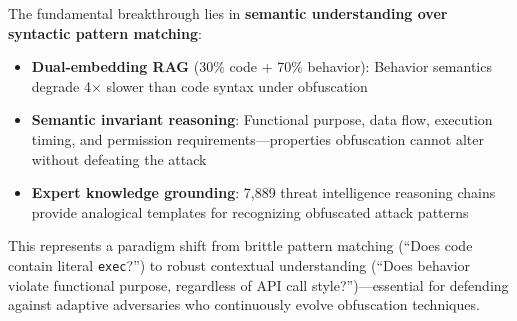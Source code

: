 The fundamental breakthrough lies in \textbf{semantic understanding over syntactic pattern matching}:
\begin{itemize}
    \item \textbf{Dual-embedding RAG} (30\% code + 70\% behavior): Behavior semantics degrade 4$\times$ slower than code syntax under obfuscation
    \item \textbf{Semantic invariant reasoning}: Functional purpose, data flow, execution timing, and permission requirements---properties obfuscation cannot alter without defeating the attack
    \item \textbf{Expert knowledge grounding}: 7,889 threat intelligence reasoning chains provide analogical templates for recognizing obfuscated attack patterns
\end{itemize}

This represents a paradigm shift from brittle pattern matching (``Does code contain literal \texttt{exec}?'') to robust contextual understanding (``Does behavior violate functional purpose, regardless of API call style?'')---essential for defending against adaptive adversaries who continuously evolve obfuscation techniques.

